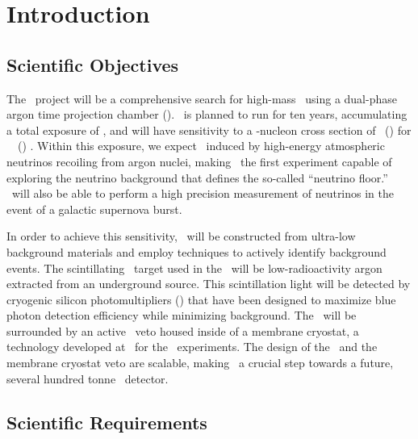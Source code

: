 \section{Introduction}


\subsection{Scientific Objectives}

The \DSk\ project will be a comprehensive search for high-mass \WIMPs\ using a dual-phase argon time projection chamber (\LArTPC). \DSk\ is planned to run for ten years, accumulating a total exposure of \DSkExtendedExposure, and will have sensitivity to a \WIMP-nucleon cross section of \DSkExtendedSensitivityOneGeVUnit\ (\DSkExtendedSensitivityTenGeVUnit) for \ \WIMPMassOneTev\ (\WIMPMassTenTev) \WIMPs.  Within this exposure, we expect \DSkNuInducedBackgroundExtendedExposureUnit\ induced by high-energy atmospheric neutrinos recoiling from argon nuclei, making \DSk\ the first experiment capable of exploring the neutrino background that defines the so-called ``neutrino floor.''  \DSk\ will also be able to perform a high precision measurement of neutrinos in the event of a galactic supernova burst.

In order to achieve this sensitivity, \DSk\ will be constructed from ultra-low background materials and employ techniques to actively identify background events. The scintillating \LAr\ target used in the \TPC\ will be low-radioactivity argon extracted from an underground source.  This scintillation light will be detected by cryogenic silicon photomultipliers (\SiPMs) that have been designed to maximize blue photon detection efficiency while minimizing background. The \LArTPC\ will be surrounded by an active \LAr\ veto housed inside of a membrane cryostat, a technology developed at \CERN\ for the \pDUNE\ experiments. The design of the \LArTPC\ and the membrane cryostat veto are scalable, making \DSk\ a crucial step towards a future, several hundred tonne \LAr\ detector.

\subsection{Scientific Requirements}
\label{sec:Introduction-ScientificRequirements}

